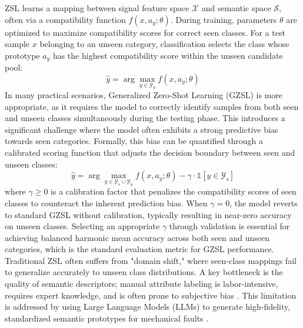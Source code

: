 ZSL learns a mapping between signal feature space $\mathcal{X}$ and semantic space $\mathcal{S}$, often via a compatibility function $f(x, a_y; \theta)$. During training, parameters $\theta$ are optimized to maximize compatibility scores for correct seen classes. For a test sample $x$ belonging to an unseen category, classification selects the class whose prototype $a_y$ has the highest compatibility score within the unseen candidate pool:
\begin{equation}
\hat{y} = \arg\max_{y \in \mathcal{Y}_u} f(x, a_y; \theta)
\end{equation}
In many practical scenarios, Generalized Zero-Shot Learning (GZSL) is more appropriate, as it requires the model to correctly identify samples from both seen and unseen classes simultaneously during the testing phase. This introduces a significant challenge where the model often exhibits a strong predictive bias towards seen categories. Formally, this bias can be quantified through a calibrated scoring function that adjusts the decision boundary between seen and unseen classes:
\begin{equation}
\hat{y} = \arg\max_{y \in \mathcal{Y}_s \cup \mathcal{Y}_u} f(x, a_y; \theta) - \gamma \cdot \mathbb{1}[y \in \mathcal{Y}_s]
\end{equation}
where $\gamma \geq 0$ is a calibration factor that penalizes the compatibility scores of seen classes to counteract the inherent prediction bias. When $\gamma = 0$, the model reverts to standard GZSL without calibration, typically resulting in near-zero accuracy on unseen classes. Selecting an appropriate $\gamma$ through validation is essential for achieving balanced harmonic mean accuracy across both seen and unseen categories, which is the standard evaluation metric for GZSL performance. Traditional ZSL often suffers from "domain shift," where seen-class mappings fail to generalize accurately to unseen class distributions. A key bottleneck is the quality of semantic descriptors; manual attribute labeling is labor-intensive, requires expert knowledge, and is often prone to subjective bias \cite{palatucci2009zero, lampert2009learning}. This limitation is addressed by using Large Language Models (LLMs) to generate high-fidelity, standardized semantic prototypes for mechanical faults \cite{xian2018zero}.

